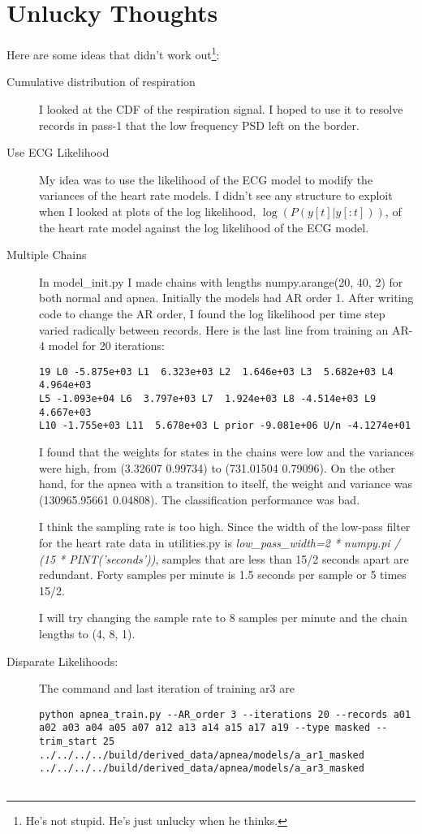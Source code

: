 \documentclass[12pt]{article}
\begin{document}
\section{Unlucky Thoughts}
\label{sec:unlucky}

Here are some ideas that didn't work out\footnote{He's not stupid.
  He's just unlucky when he thinks.}:
\begin{description}
\item[Cumulative distribution of respiration] I looked at the CDF of
  the respiration signal.  I hoped to use it to resolve records in
  pass-1 that the low frequency PSD left on the border.
\item[Use ECG Likelihood] My idea was to use the likelihood of the ECG
  model to modify the variances of the heart rate models.  I didn't
  see any structure to exploit when I looked at plots of the log
  likelihood, $\log\left(P(y[t]|y[:t]) \right)$, of the heart rate
  model against the log likelihood of the ECG model.
\item[Multiple Chains] In model\_init.py I made chains with lengths
  numpy.arange(20, 40, 2) for both normal and apnea.  Initially the
  models had AR order 1.  After writing code to change the AR order, I
  found the log likelihood per time step varied radically between
  records.  Here is the last line from training an AR-4 model for 20
  iterations:
\begin{verbatim}
19 L0 -5.875e+03 L1  6.323e+03 L2  1.646e+03 L3  5.682e+03 L4  4.964e+03
L5 -1.093e+04 L6  3.797e+03 L7  1.924e+03 L8 -4.514e+03 L9  4.667e+03
L10 -1.755e+03 L11  5.678e+03 L prior -9.081e+06 U/n -4.1274e+01
\end{verbatim}
  I found that the weights for states in the chains were low and the
  variances were high, from (3.32607 0.99734) to (731.01504 0.79096).
  On the other hand, for the apnea with a transition to itself, the
  weight and variance was (130965.95661 0.04808).  The classification
  performance was bad.

  I think the sampling rate is too high.  Since the width of the
  low-pass filter for the heart rate data in utilities.py is
  \emph{low\_pass\_width=2 * numpy.pi / (15 * PINT('seconds'))},
  samples that are less than 15/2 seconds apart are redundant.  Forty
  samples per minute is 1.5 seconds per sample or 5 times 15/2.

  I will try changing the sample rate to 8 samples per minute and the
  chain lengths to (4, 8, 1).
\item[Disparate Likelihoods:] The command and last iteration of
  training ar3 are
\begin{verbatim}
python apnea_train.py --AR_order 3 --iterations 20 --records a01 a02 a03 a04 a05 a07 a12 a13 a14 a15 a17 a19 --type masked --trim_start 25 ../../../../build/derived_data/apnea/models/a_ar1_masked ../../../../build/derived_data/apnea/models/a_ar3_masked


\end{verbatim}
\end{description}
\end{document}
